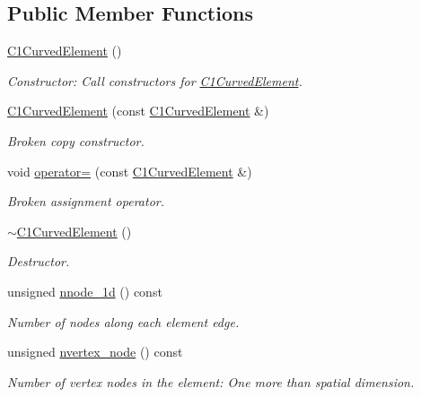 \subsection*{Public Member Functions}
\begin{DoxyCompactItemize}
\item 
\hyperlink{classoomph_1_1C1CurvedElement_3_012_00_01NNODE__1D_01_4_a4e389db9bdba834069675c79661e15fc}{C1\+Curved\+Element} ()
\begin{DoxyCompactList}\small\item\em Constructor\+: Call constructors for \hyperlink{classoomph_1_1C1CurvedElement}{C1\+Curved\+Element}. \end{DoxyCompactList}\item 
\hyperlink{classoomph_1_1C1CurvedElement_3_012_00_01NNODE__1D_01_4_a0d00b19541ec32162c0d096fef8fcf74}{C1\+Curved\+Element} (const \hyperlink{classoomph_1_1C1CurvedElement}{C1\+Curved\+Element} \&)
\begin{DoxyCompactList}\small\item\em Broken copy constructor. \end{DoxyCompactList}\item 
void \hyperlink{classoomph_1_1C1CurvedElement_3_012_00_01NNODE__1D_01_4_a2c69150bcb82422fb38db3eeea3b0606}{operator=} (const \hyperlink{classoomph_1_1C1CurvedElement}{C1\+Curved\+Element} \&)
\begin{DoxyCompactList}\small\item\em Broken assignment operator. \end{DoxyCompactList}\item 
\hyperlink{classoomph_1_1C1CurvedElement_3_012_00_01NNODE__1D_01_4_a32a0cf8b60d16d887d5fc3ed261c2147}{$\sim$\+C1\+Curved\+Element} ()
\begin{DoxyCompactList}\small\item\em Destructor. \end{DoxyCompactList}\item 
unsigned \hyperlink{classoomph_1_1C1CurvedElement_3_012_00_01NNODE__1D_01_4_a3e7e8460e53e261ff68ac58ea57dfc87}{nnode\+\_\+1d} () const
\begin{DoxyCompactList}\small\item\em Number of nodes along each element edge. \end{DoxyCompactList}\item 
unsigned \hyperlink{classoomph_1_1C1CurvedElement_3_012_00_01NNODE__1D_01_4_abc52b97fb811db2bdb58661442dbffdf}{nvertex\+\_\+node} () const
\begin{DoxyCompactList}\small\item\em Number of vertex nodes in the element\+: One more than spatial dimension. \end{DoxyCompactList}\item 

\end{DoxyCompactItemize}
